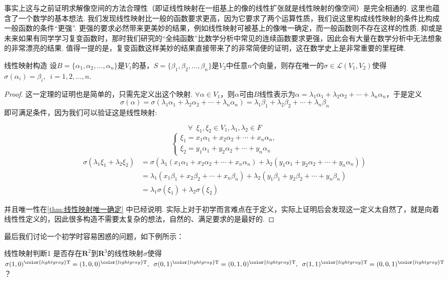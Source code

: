 事实上这与之前证明求解像空间的方法合理性（即证线性映射在一组基上的像的线性扩张就是线性映射的像空间）是完全相通的. 这里也蕴含了一个数学的基本想法. 我们发现线性映射比一般的函数要求更高，因为它要求了两个运算性质，我们说这里构成线性映射的条件比构成一般函数的条件``更强''. 更强的要求必然带来更美妙的结果，例如线性映射可被基上的像唯一确定，而一般函数则不存在这样的性质. 抑或是未来如果有同学学习复变函数时，那时我们研究的``全纯函数''比数学分析中常见的连续函数要求更强，因此会有大量在数学分析中无法想象的非常漂亮的结果. 值得一提的是，复变函数这样美妙的结果直接带来了的非常简便的证明，这在数学史上是非常重要的里程碑.

\begin{theorem}{}{线性映射构造}
    设$B=\{\alpha_1,\alpha_2,\ldots,\alpha_n\}$是$V_1$的基，$S=\{\beta_1,\beta_2,\ldots,\beta_n\}$是$V_2$中任意$n$个向量，则存在唯一的$\sigma\in \mathcal{L}(V_1,V_2)$使得$\sigma(\alpha_i)=\beta_i,\enspace i=1,2,\ldots,n$.
\end{theorem}

\begin{proof}
这一定理的证明也是简单的，只需先定义出这个映射. $\forall \alpha \in V_1$，则$\alpha$可由$B$线性表示为$\alpha=\lambda_1\alpha_1+\lambda_2\alpha_2+\cdots+\lambda_n\alpha_n$，于是定义
\[\sigma(\alpha)=\sigma(\lambda_1\alpha_1+\lambda_2\alpha_2+\cdots+\lambda_n\alpha_n)=\lambda_1\beta_1+\lambda_2\beta_2+\cdots+\lambda_n\beta_n\]
即可满足条件，因为我们可以验证这是线性映射:

\[
\forall \enspace \xi_1, \xi_2 \in V_1, \lambda_1, \lambda_2 \in F
\]
\[
\begin{cases}
    \xi_1 = x_1\alpha_1+x_2\alpha_2+\cdots+x_n\alpha_n,\\
    \xi_2 = y_1\alpha_1+y_2\alpha_2+\cdots+y_n\alpha_n
\end{cases}
\]
\begin{align*}
\sigma(\lambda_1 \xi_1 + \lambda_2 \xi_2) &= \sigma(\lambda_1(x_1\alpha_1+x_2\alpha_2+\cdots+x_n\alpha_n) + \lambda_2(y_1\alpha_1+y_2\alpha_2+\cdots+y_n\alpha_n))\\
&= \lambda_1(x_1\beta_1+x_2\beta_2+\cdots+x_n\beta_n) + \lambda_2(y_1\beta_1+y_2\beta_2+\cdots+y_n\beta_n)\\
&= \lambda_1\sigma(\xi_1) + \lambda_2\sigma(\xi_2)
\end{align*}

并且唯一性在\autoref{thm:线性映射唯一确定} 中已经说明. 实际上对于初学而言难点在于定义，实际上证明后会发现这一定义太自然了，就是向着线性性定义的，因此很多构造不需要太复杂的想法，自然的、满足要求的是最好的.
\end{proof}
最后我们讨论一个初学时容易困惑的问题，如下例所示：
\begin{example}{}{线性映射判断1}
    是否存在$\mathbf{R}^2$到$\mathbf{R}^3$的线性映射$\sigma$使得$\sigma(1,0)^{\color{lightgray}\mathrm{T}}=(1,0,0)^{\color{lightgray}\mathrm{T}},\enspace\sigma(0,1)^{\color{lightgray}\mathrm{T}}=(0,1,0)^{\color{lightgray}\mathrm{T}},\enspace\sigma(1,1)^{\color{lightgray}\mathrm{T}}=(0,0,1)^{\color{lightgray}\mathrm{T}}$？
\end{example}

